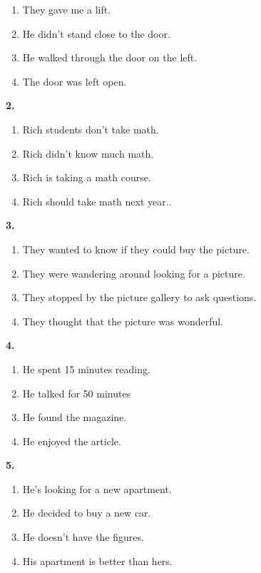 \documentclass[12pt]{article}
\begin{document}
\begin{enumerate}[label=(\Alph*),leftmargin=*,itemsep=0.2em]
\item They gave me a lift.
\item He didn't stand close to the door.
\item He walked through the door on the left.
\item The door was left open.
\end{enumerate}
\par
\vspace{0.25\baselineskip}
\noindent\textbf{2.}
\begin{enumerate}[label=(\Alph*),leftmargin=*,itemsep=0.2em]
\item Rich students don't take math.
\item Rich didn't know much math.
\item Rich is taking a math course.
\item Rich should take math next year..
\end{enumerate}
\par
\vspace{0.25\baselineskip}
\noindent\textbf{3.}
\begin{enumerate}[label=(\Alph*),leftmargin=*,itemsep=0.2em]
\item They wanted to know if they could buy the picture.
\item They were wandering around looking for a picture.
\item They stopped by the picture gallery to ask questions.
\item They thought that the picture was wonderful.
\end{enumerate}
\par
\vspace{0.25\baselineskip}
\noindent\textbf{4.}
\begin{enumerate}[label=(\Alph*),leftmargin=*,itemsep=0.2em]
\item He spent 15 minutes reading.
\item He talked for 50 minutes
\item He found the magazine.
\item He enjoyed the article.
\end{enumerate}
\par
\vspace{0.25\baselineskip}
\noindent\textbf{5.}
\begin{enumerate}[label=(\Alph*),leftmargin=*,itemsep=0.2em]
\item He's looking for a new apartment.
\item He decided to buy a new car.
\item He doesn't have the figures.
\item His apartment is better than hers.
\end{enumerate}
\end{document}
